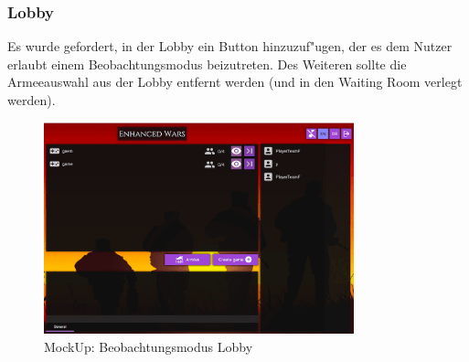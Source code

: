 \documentclass[12pt, titlepage]{scrartcl}
\begin{document}
	        \subsubsection{Lobby}
	           Es wurde gefordert, in der Lobby ein Button hinzuzuf"ugen, der es dem Nutzer erlaubt einem Beobachtungsmodus beizutreten. Des Weiteren sollte die Armeeauswahl aus der Lobby entfernt werden (und in den Waiting Room verlegt werden). \\
	            \begin{figure}[H] 
    				\centering
    				\includegraphics[width=0.8\textwidth]{images/mockUps/LobbyWatchMode.png}
    				\caption{MockUp: Beobachtungsmodus Lobby}
    				\label{Watch_Mode}
			    \end{figure}
\end{document}
